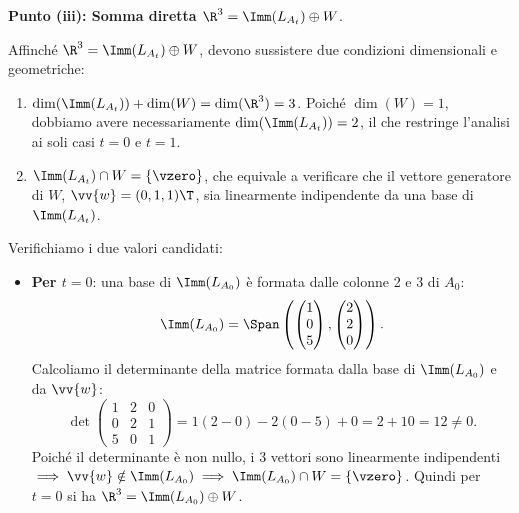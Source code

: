 \begin{dimostrazione}
\textbf{Punto (iii): Somma diretta $\R^3 = \Imm(L_{A_t}) \oplus W$}.

Affinché $\R^3 = \Imm(L_{A_t}) \oplus W$, devono sussistere due condizioni dimensionali e geometriche:
\begin{enumerate}
    \item $\dim(\Imm(L_{A_t})) + \dim(W) = \dim(\R^3) = 3$. Poiché $\dim(W) = 1$, dobbiamo avere necessariamente $\dim(\Imm(L_{A_t})) = 2$, il che restringe l'analisi ai soli casi $t = 0$ e $t = 1$.
    \item $\Imm(L_{A_t}) \cap W = \{\vzero\}$, che equivale a verificare che il vettore generatore di $W$, $\vv{w} = (0, 1, 1)\T$, sia linearmente indipendente da una base di $\Imm(L_{A_t})$.
\end{enumerate}
Verifichiamo i due valori candidati:
\begin{itemize}
    \item \textbf{Per $t = 0$}: una base di $\Imm(L_{A_0})$ è formata dalle colonne 2 e 3 di $A_0$:
    \begin{equation}
        \Imm(L_{A_0}) = \Span\left( \begin{pmatrix} 1 \\ 0 \\ 5 \end{pmatrix}, \begin{pmatrix} 2 \\ 2 \\ 0 \end{pmatrix} \right).
    \end{equation}
    Calcoliamo il determinante della matrice formata dalla base di $\Imm(L_{A_0})$ e da $\vv{w}$:
    \begin{equation}
        \det \begin{pmatrix} 1 & 2 & 0 \\ 0 & 2 & 1 \\ 5 & 0 & 1 \end{pmatrix} = 1(2 - 0) - 2(0 - 5) + 0 = 2 + 10 = 12 \neq 0.
    \end{equation}
    Poiché il determinante è non nullo, i 3 vettori sono linearmente indipendenti $\implies \vv{w} \notin \Imm(L_{A_0}) \implies \Imm(L_{A_0}) \cap W = \{\vzero\}$.
    Quindi per $t = 0$ si ha $\R^3 = \Imm(L_{A_0}) \oplus W$.


\end{itemize}
\end{dimostrazione}
